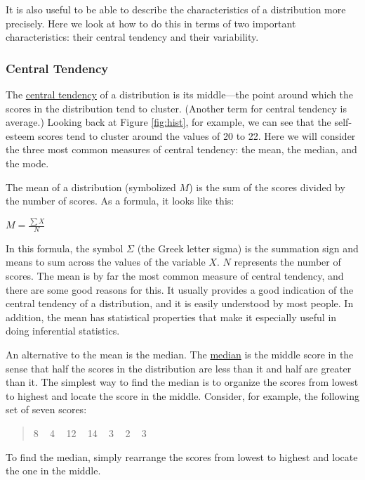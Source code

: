 \documentclass[
]{krantz}
\begin{document}
It is also useful to be able to describe the characteristics of a distribution more precisely. Here we look at how to do this in terms of two important characteristics: their central tendency and their variability.

\hypertarget{central-tendency}{%
\subsubsection*{Central Tendency}\label{central-tendency}}


The \protect\hyperlink{central-tendency-1}{central tendency} of a distribution is its middle---the point around which the scores in the distribution tend to cluster. (Another term for central tendency is average.) Looking back at Figure \ref{fig:hist}, for example, we can see that the self-esteem scores tend to cluster around the values of 20 to 22. Here we will consider the three most common measures of central tendency: the mean, the median, and the mode.

The mean of a distribution (symbolized \(M\)) is the sum of the scores divided by the number of scores. As a formula, it looks like this:

\(M = \frac{\sum X}{N}\)

In this formula, the symbol \(Σ\) (the Greek letter sigma) is the summation sign and means to sum across the values of the variable \(X\). \(N\) represents the number of scores. The mean is by far the most common measure of central tendency, and there are some good reasons for this. It usually provides a good indication of the central tendency of a distribution, and it is easily understood by most people. In addition, the mean has statistical properties that make it especially useful in doing inferential statistics.

An alternative to the mean is the median. The \protect\hyperlink{median}{median} is the middle score in the sense that half the scores in the distribution are less than it and half are greater than it. The simplest way to find the median is to organize the scores from lowest to highest and locate the score in the middle. Consider, for example, the following set of seven scores:

\begin{quote}
8 ~ 4 ~ 12 ~ 14 ~ 3 ~ 2 ~ 3
\end{quote}

To find the median, simply rearrange the scores from lowest to highest and locate the one in the middle.
\end{document}
